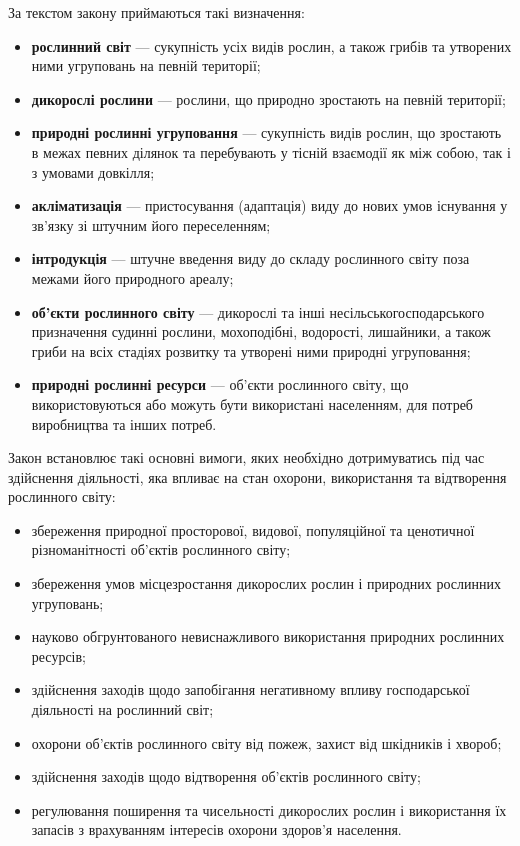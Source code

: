 \documentclass[a4paper,oneside,DIV=10,12pt]{scrreprt}
\newcommand\defterm[1]{\textbf{#1}}
\begin{document}
			За текстом закону приймаються такі визначення:
			\begin{itemize}
				\item \defterm{рослинний світ} --- сукупність усіх видів рослин, а також грибів та утворених ними угруповань на певній території;
				\item \defterm{дикорослі рослини} --- рослини, що природно зростають на певній території;
				\item \defterm{природні рослинні угруповання} --- сукупність видів рослин, що зростають в межах певних ділянок та перебувають у тісній взаємодії як між собою, так і з умовами довкілля;
				\item \defterm{акліматизація} --- пристосування (адаптація) виду до нових умов існування у зв'язку зі штучним його переселенням;
				\item \defterm{інтродукція} --- штучне введення виду до складу рослинного світу поза межами його природного ареалу;
				\item \defterm{об'єкти рослинного світу} --- дикорослі та інші несільськогосподарського призначення судинні рослини, мохоподібні, водорості, лишайники, а також гриби на всіх стадіях розвитку та утворені ними природні угруповання;
				\item \defterm{природні рослинні ресурси} --- об'єкти рослинного світу, що використовуються або можуть бути використані населенням, для потреб виробництва та інших потреб.
			\end{itemize}
			
			Закон встановлює такі основні вимоги, яких необхідно дотримуватись під час здійснення діяльності, яка впливає на стан охорони, використання та відтворення рослинного світу:
			\begin{itemize}
				\item збереження природної просторової, видової, популяційної та ценотичної різноманітності об'єктів рослинного світу;
				\item збереження умов місцезростання дикорослих рослин і природних рослинних угруповань;
				\item науково обгрунтованого невиснажливого використання природних рослинних ресурсів;
				\item здійснення заходів щодо запобігання негативному впливу господарської діяльності на рослинний світ;
				\item охорони об'єктів рослинного світу від пожеж, захист від шкідників і хвороб;
				\item здійснення заходів щодо відтворення об'єктів рослинного світу;
				\item регулювання поширення та чисельності дикорослих рослин і використання їх запасів з врахуванням інтересів охорони здоров'я населення.
			\end{itemize}
			
\end{document}
